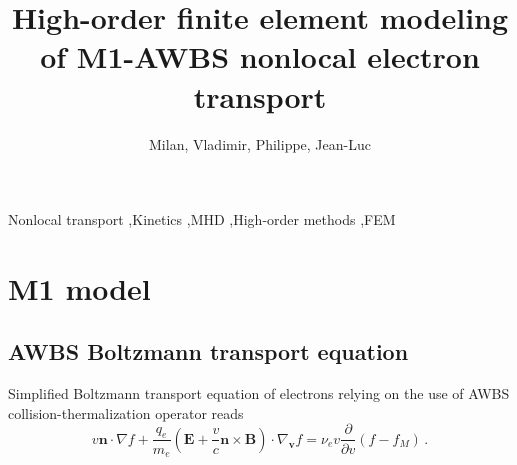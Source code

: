 \documentclass[review]{elsarticle}
\newcommand{\pdv}[2]{\frac{\partial{#1}}{\partial{#2}}}
\newcommand{\vect}[1]{\boldsymbol{#1}}
\newcommand{\nue}{\nu_{e}}
\newcommand{\vmag}{v}
\newcommand{\vn}{\vect{n}}
\newcommand{\E}{\vect{E}}
\newcommand{\B}{\vect{B}}
\newcommand{\qe}{q_e}
\newcommand{\me}{m_e}
\newcommand{\fM}{f_M}
\begin{document}
\begin{frontmatter}

\title{High-order finite element modeling of M1-AWBS nonlocal electron transport}

\author[celiaaddress]{Milan, Vladimir, Philippe, Jean-Luc}
\address[celiaaddress]{Universit\'{e} de Bordeaux - CNRS - CEA, CELIA, UMR 5107, F-33405 Talence, France}


\begin{abstract}

\end{abstract}

\begin{keyword}
Nonlocal transport \sep Kinetics \sep MHD \sep High-order methods \sep FEM
\end{keyword}

\end{frontmatter}

\linenumbers


\newpage


\section{M1 model}\label{sec:m1_model}
\subsection{AWBS Boltzmann transport equation}
Simplified Boltzmann transport equation of electrons relying on the use of AWBS
collision-thermalization operator \cite{AWBS_PRL1986} reads
\begin{equation}
  \vmag\vn\cdot\nabla f + \frac{\qe}{\me}\left( \E + 
  \frac{\vmag}{c}\vn\times\B\right)\cdot\nabla_{\vect{v}} f = \nue \vmag 
  \pdv{}{\vmag}\left( f - \fM\right)\, .
  \label{eq:AWBS}
\end{equation}
\end{document}
